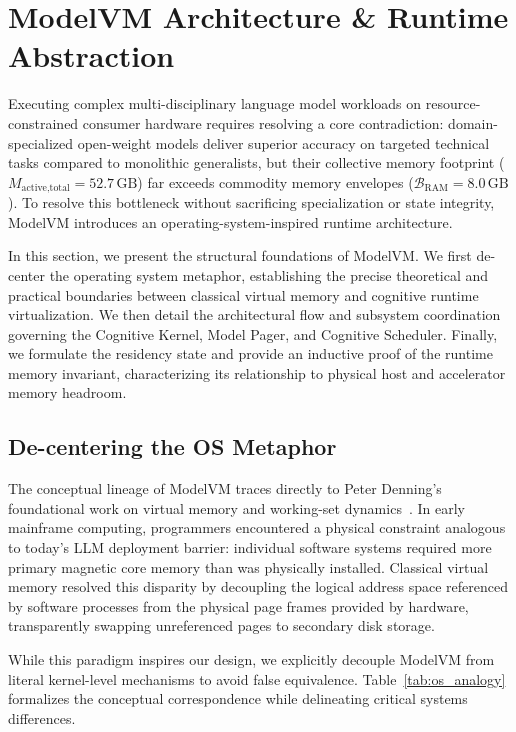 \section{ModelVM Architecture \& Runtime Abstraction}
\label{sec:runtime_architecture}

Executing complex multi-disciplinary language model workloads on resource-constrained consumer hardware requires resolving a core contradiction: domain-specialized open-weight models deliver superior accuracy on targeted technical tasks compared to monolithic generalists, but their collective memory footprint ($M_{\text{active,total}} = 52.7\,\text{GB}$) far exceeds commodity memory envelopes ($\mathcal{B}_{\text{RAM}} = 8.0\,\text{GB}$). To resolve this bottleneck without sacrificing specialization or state integrity, ModelVM introduces an operating-system-inspired runtime architecture. 

In this section, we present the structural foundations of ModelVM. We first de-center the operating system metaphor, establishing the precise theoretical and practical boundaries between classical virtual memory and cognitive runtime virtualization. We then detail the architectural flow and subsystem coordination governing the Cognitive Kernel, Model Pager, and Cognitive Scheduler. Finally, we formulate the residency state and provide an inductive proof of the runtime memory invariant, characterizing its relationship to physical host and accelerator memory headroom.

\subsection{De-centering the OS Metaphor}
\label{sec:os_analogy}

The conceptual lineage of ModelVM traces directly to Peter Denning's foundational work on virtual memory and working-set dynamics~\cite{denning1968working}. In early mainframe computing, programmers encountered a physical constraint analogous to today's LLM deployment barrier: individual software systems required more primary magnetic core memory than was physically installed. Classical virtual memory resolved this disparity by decoupling the logical address space referenced by software processes from the physical page frames provided by hardware, transparently swapping unreferenced pages to secondary disk storage.

While this paradigm inspires our design, we explicitly decouple ModelVM from literal kernel-level mechanisms to avoid false equivalence. Table~\ref{tab:os_analogy} formalizes the conceptual correspondence while delineating critical systems differences.

